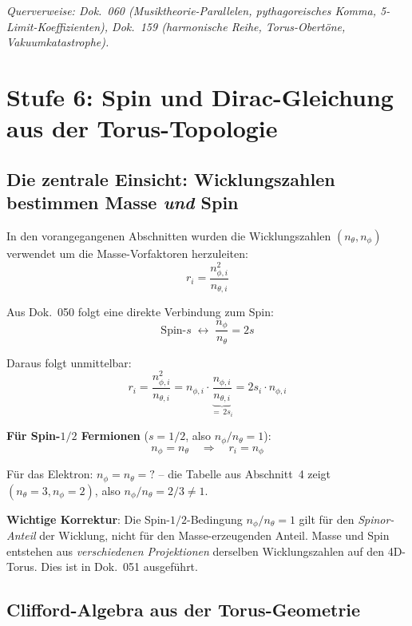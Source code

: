 \noindent\textit{Querverweise: Dok.~060 (Musiktheorie-Parallelen,
pythagoreisches Komma, 5-Limit-Koeffizienten),
Dok.~159 (harmonische Reihe, Torus-Obertöne, Vakuumkatastrophe).}

\section{Stufe 6: Spin und Dirac-Gleichung aus der Torus-Topologie}

\subsection{Die zentrale Einsicht: Wicklungszahlen bestimmen Masse \emph{und} Spin}

In den vorangegangenen Abschnitten wurden die Wicklungszahlen
$(n_\theta, n_\phi)$ verwendet um die Masse-Vorfaktoren herzuleiten:
\begin{equation}
    r_i = \frac{n_{\phi,i}^2}{n_{\theta,i}}
\end{equation}

Aus Dok.~050 folgt eine direkte Verbindung zum Spin:
\begin{equation}
    \text{Spin-}s \;\longleftrightarrow\; \frac{n_\phi}{n_\theta} = 2s
\end{equation}

Daraus folgt unmittelbar:
\begin{equation}
    \boxed{r_i = \frac{n_{\phi,i}^2}{n_{\theta,i}}
    = n_{\phi,i} \cdot \underbrace{\frac{n_{\phi,i}}{n_{\theta,i}}}_{=\,2s_i}
    = 2 s_i \cdot n_{\phi,i}}
\end{equation}

\textbf{Für Spin-$1/2$ Fermionen} ($s = 1/2$, also $n_\phi/n_\theta = 1$):
\begin{equation}
    n_\phi = n_\theta \quad \Rightarrow \quad r_i = n_\phi
\end{equation}

Für das Elektron: $n_\phi = n_\theta = ?$ -- die Tabelle aus
Abschnitt~4 zeigt $(n_\theta = 3, n_\phi = 2)$, also
$n_\phi/n_\theta = 2/3 \neq 1$.

\textbf{Wichtige Korrektur}: Die Spin-$1/2$-Bedingung
$n_\phi/n_\theta = 1$ gilt für den \emph{Spinor-Anteil} der Wicklung,
nicht für den Masse-erzeugenden Anteil. Masse und Spin entstehen aus
\emph{verschiedenen Projektionen} derselben Wicklungszahlen auf den
4D-Torus. Dies ist in Dok.~051 ausgeführt.

\subsection{Clifford-Algebra aus der Torus-Geometrie}

